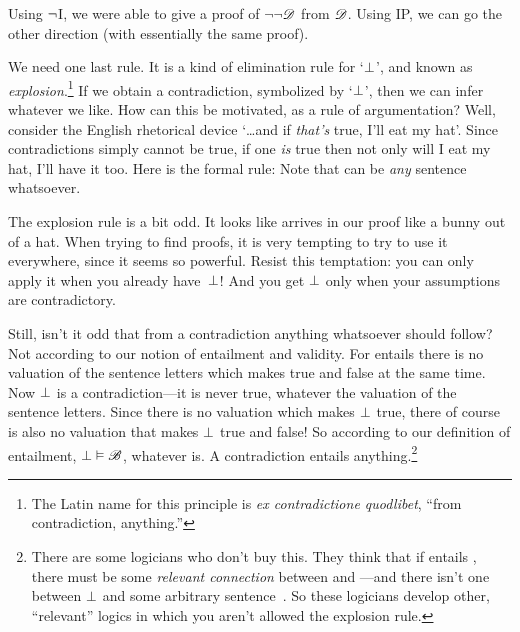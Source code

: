 Using $\neg$I, we were able to give a proof of $\neg\neg\mathscr{D}$ from $\mathscr{D}$. Using IP, we can go the other direction (with essentially the same proof).
	\begin{fitchproof}
		\PR
		\open
			\AS
		\close
	\end{fitchproof}

We need one last rule. It is a kind of elimination rule for `$\bot$', and known as \emph{explosion}.\footnote{The Latin name for this principle is \emph{ex contradictione quodlibet}, ``from contradiction, anything.''} If we obtain a contradiction, symbolized by `$\bot$', then we can infer whatever we like. How can this be motivated, as a rule of argumentation? Well, consider the English rhetorical device `\ldots and if \emph{that's} true, I'll eat my hat'. Since contradictions simply cannot be true, if one \emph{is} true then not only will I eat my hat, I'll have it too. Here is the formal rule:
Note that  can be \emph{any} sentence whatsoever.

The explosion rule is a bit odd. It looks like  arrives in our proof like a bunny out of a hat. When trying to find proofs, it is very tempting to try to use it everywhere, since it seems so powerful. Resist this temptation: you can only apply it when you already have~$\bot$!  And you get $\bot$ only when your assumptions are contradictory.

Still, isn't it odd that from a contradiction anything whatsoever should follow? Not according to our notion of entailment and validity. For  entails  \ifeff{} there is no valuation of the sentence letters which makes  true and  false at the same time. Now $\bot$ is a contradiction---it is never true, whatever the valuation of the sentence letters. Since there is no valuation which makes $\bot$ true, there of course is also no valuation that makes $\bot$ true and  false! So according to our definition of entailment, $\bot \vDash \mathscr{B}$, whatever  is. A contradiction entails anything.\footnote{There are some logicians who don't buy this. They think that if  entails , there must be some \emph{relevant connection} between  and ---and there isn't one between $\bot$ and some arbitrary sentence~. So these logicians develop other, ``relevant'' logics in which you aren't allowed the explosion rule.}

